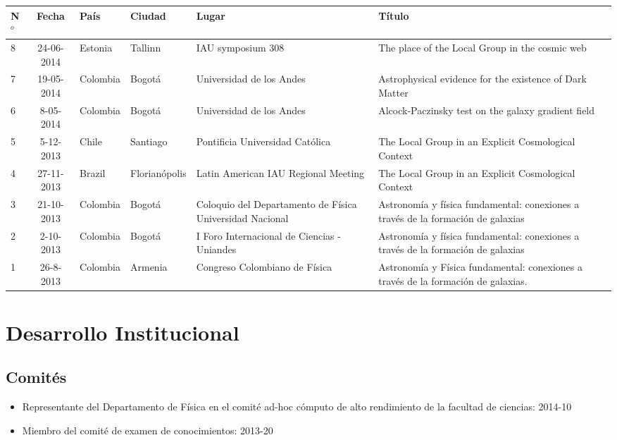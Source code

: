 \documentclass{article}
\begin{document}
\begin{tabular}{l c l l p{2cm} p{5cm}}\hline
N$^{o}$ & Fecha & Pa\'is & Ciudad & Lugar & T\'itulo \\\hline
8 & 24-06-2014 & Estonia & Tallinn & IAU symposium 308 & The place of the
Local Group in the cosmic web\\ \hline
7 & 19-05-2014 & Colombia & Bogot\'a & Universidad de los Andes &
Astrophysical evidence for the existence of Dark Matter\\ \hline
6 & 8-05-2014 & Colombia & Bogot\'a & Universidad de los Andes &
Alcock-Paczinsky test on the galaxy gradient field \\ \hline
5 & 5-12-2013 & Chile & Santiago & Pontificia Universidad Cat\'olica &
The Local Group in an Explicit Cosmological Context\\\hline 
4 & 27-11-2013 & Brazil & Florian\'opolis & Latin American IAU
Regional Meeting & The Local Group in an Explicit Cosmological
Context\\\hline 
3 & 21-10-2013 & Colombia & Bogot\'a & Coloquio del Departamento de
F\'isica Universidad Nacional & Astronom\'ia y f\'isica fundamental:
conexiones a trav\'es de la formaci\'on de galaxias\\\hline 
2 & 2-10-2013 & Colombia & Bogot\'a & I Foro Internacional de Ciencias
- Uniandes & Astronom\'ia y f\'isica fundamental: conexiones a
trav\'es de la formaci\'on de galaxias\\\hline 
1 & 26-8-2013 & Colombia & Armenia & Congreso Colombiano de F\'isica &
Astronom\'ia y F\'isica fundamental: conexiones a trav\'es de la
formaci\'on de galaxias.\\  \hline 
\end{tabular}
\section{Desarrollo Institucional}

\subsection{Comit\'es}
\begin{itemize}
\item {Representante del Departamento de F\'isica en el comit\'e
  ad-hoc c\'omputo de alto rendimiento de la facultad de ciencias}:
  2014-10  
\item {Miembro del comit\'e de examen de conocimientos}: 2013-20 
\end{itemize}
\end{document}
